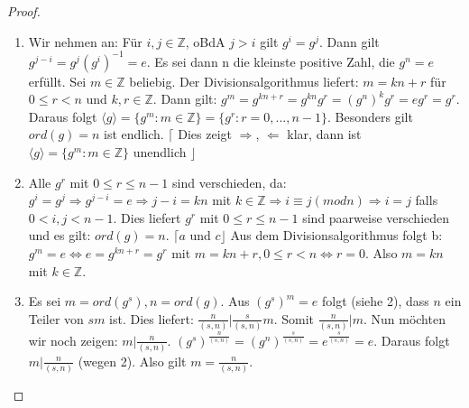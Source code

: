 \documentclass[fleqn, 12pt]{scrartcl}
\theoremstyle{definition}
\theoremstyle{remark}
\begin{document}
\begin{proof}
	\begin{enumerate}
		\item Wir nehmen an: Für \(i,j \in \mathbb{Z}\), oBdA \(j>i\) gilt \(g^{i}=g^{j}\). \newline Dann gilt \(g^{j-i}=g^{j}(g^{i})^{-1}=e\). \newline Es sei dann n die kleinste positive Zahl, die \(g^{n}=e\) erfüllt. Sei \(m \in \mathbb{Z}\) beliebig. Der Divisionsalgorithmus liefert: \(m=kn+r\) für \(0 \leq r < n\) und \(k,r \in \mathbb{Z}\). Dann gilt: \newline \(g^{m}=g^{kn+r}=g^{kn}g^{r}=(g^{n})^{k}g^{r}=eg^{r}=g^{r}\). \newline Daraus folgt \(\langle g \rangle = \lbrace g^{m} : m \in \mathbb{Z}\rbrace = \lbrace g^{r} : r=0,...,n-1\rbrace\). Besonders gilt \(ord(g)=n\) ist endlich. \newline \(\lceil\) Dies zeigt \(\Rightarrow\), \(\Leftarrow\) klar, dann ist \(\langle g \rangle = \lbrace g^{m} : m \in \mathbb{Z}\rbrace\) unendlich \(\rfloor\)
		\item Alle \(g^{r}\) mit \(0 \leq r \leq n-1\) sind verschieden, da: \newline \(g^{i}=g^{j} \Rightarrow g^{j-i}=e \Rightarrow j-i = kn\) mit \(k \in \mathbb{Z} \Rightarrow i \equiv j (modn) \Rightarrow i=j\) falls \(0<i,j<n-1\). \newline Dies liefert \(g^{r}\) mit \(0 \leq r \leq n-1\) sind paarweise verschieden und es gilt: \newline \(ord(g)=n\). \(\lceil a\) und \(c\rfloor\) \newline Aus dem Divisionsalgorithmus folgt b: \(g^{m}=e \Leftrightarrow e=g^{kn+r}=g^{r}\) mit \(m = kn+r, 0 \leq r < n \Leftrightarrow r=0\). Also \(m=kn\) mit \(k \in \mathbb{Z}\).
		\item Es sei \(m=ord(g^{s}), n =ord(g)\). Aus \((g^{s})^{m}=e\) folgt (siehe 2), dass \(n\) ein Teiler von \(sm\) ist. Dies liefert: \(\frac{n}{(s,n)} \vert \frac{s}{(s,n)}m\). Somit \(\frac{n}{(s,n)} \vert m\). \newline Nun möchten wir noch zeigen: \(m \vert \frac{n}{(s,n)}\). \((g^{s})^{\frac{n}{(s,n)}} = (g^{n})^{\frac{s}{(s,n)}}=e^{\frac{s}{(s,n)}}=e\). Daraus folgt \(m \vert \frac{n}{(s,n)}\) (wegen 2). \newline Also gilt \(m = \frac{n}{(s,n)}\). 
	\end{enumerate}
\end{proof}
\end{document}
